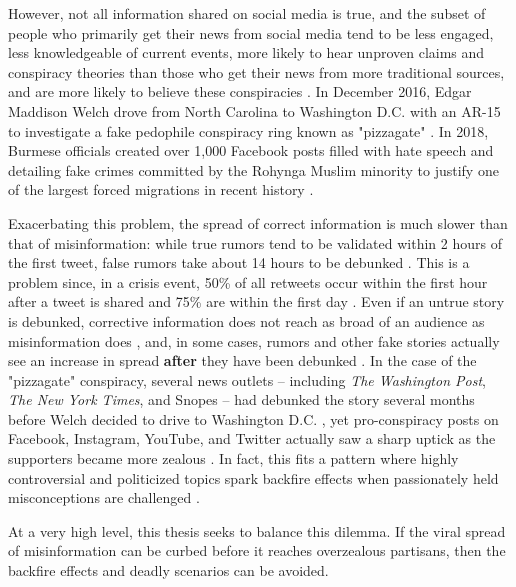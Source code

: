 \documentclass[preprint,review,12pt]{elsarticle}
\begin{document}
However, not all information shared on social media is true, and the subset of people who primarily get their news from social media tend to be less engaged, less knowledgeable of current events, more likely to hear unproven claims and conspiracy theories than those who get their news from more traditional sources, and are more likely to believe these conspiracies \cite{mitchell2020americans}. In December 2016, Edgar Maddison Welch drove from North Carolina to Washington D.C. with an AR-15 to investigate a fake pedophile conspiracy ring known as "pizzagate" \cite{goldman2016comet}. In 2018, Burmese officials created over 1,000 Facebook posts filled with hate speech and detailing fake crimes committed by the Rohynga Muslim minority to justify one of the largest forced migrations in recent history \cite{subedar2018country}.

Exacerbating this problem, the spread of correct information is much slower than that of misinformation: while true rumors tend to be validated within 2 hours of the first tweet, false rumors take about 14 hours to be debunked \cite{zubiaga2016analysing,shao2016hoaxy}. This is a problem since, in a crisis event, 50\% of all retweets occur within the first hour after a tweet is shared and 75\% are within the first day \cite{kwak2010twitter}. Even if an untrue story is debunked, corrective information does not reach as broad of an audience as misinformation does \cite{maddock2015characterizing, vosoughi2018spread}, and, in some cases, rumors and other fake stories actually see an increase in spread \textbf{after} they have been debunked \cite{starbird2014rumors}. In the case of the "pizzagate" conspiracy, several news outlets -- including \textit{The Washington Post}, \textit{The New York Times}, and Snopes -- had debunked the story several months before Welch decided to drive to Washington D.C. \cite{kang2016fake,lacapria2016fact,board_2016}, yet pro-conspiracy posts on Facebook, Instagram, YouTube, and Twitter actually saw a sharp uptick as the supporters became more zealous \cite{kang2016washington}. In fact, this fits a pattern where highly controversial and politicized topics spark backfire effects when passionately held misconceptions are challenged \cite{gollust2009polarizing,nyhan2010corrections,nyhan2013hazards,redlawsk2010affective,schaffner2016misinformation,hart2012boomerang}.

At a very high level, this thesis seeks to balance this dilemma. If the viral spread of misinformation can be curbed before it reaches overzealous partisans, then the backfire effects and deadly scenarios can be avoided. 
\end{document}
